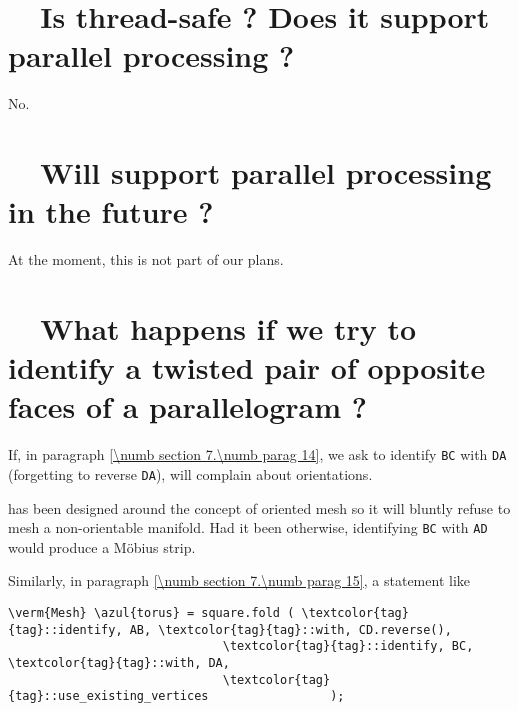 \section{~~Is {\maniFEM} thread-safe ? Does it support parallel processing ?}
\label{\numb section 13.\numb parag 3}

No.


\section{~~Will {\maniFEM} support parallel processing in the future ?}
\label{\numb section 13.\numb parag 4}

At the moment, this is not part of our plans.


\section{~~What happens if we try to identify a twisted pair of
           opposite faces of a parallelogram ?}
\label{\numb section 13.\numb parag 5}

If, in paragraph \ref{\numb section 7.\numb parag 14}, we ask {\maniFEM} to identify
{\small\tt BC} with {\small\tt DA} (forgetting to reverse {\small\tt DA}),
{\maniFEM} will complain about orientations.

\ManiFEM{} has been designed around the concept of oriented mesh so it will
bluntly refuse to mesh a non-orientable manifold.
Had it been otherwise, identifying {\small\tt BC} with {\small\tt AD}
would produce a M\"obius strip.

Similarly, in paragraph \ref{\numb section 7.\numb parag 15}, a statement like

\begin{Verbatim}[commandchars=\\\{\},formatcom=\small\tt,
   baselinestretch=0.94,framesep=2mm                     ]
   \verm{Mesh} \azul{torus} = square.fold ( \textcolor{tag}{tag}::identify, AB, \textcolor{tag}{tag}::with, CD.reverse(),
                              \textcolor{tag}{tag}::identify, BC, \textcolor{tag}{tag}::with, DA,
                              \textcolor{tag}{tag}::use_existing_vertices                 );
\end{Verbatim}

